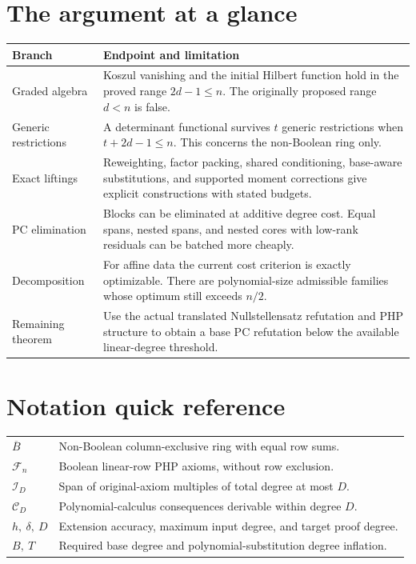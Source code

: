 \documentclass[11pt,oneside]{report}
\theoremstyle{research}
\theoremstyle{definition}
\theoremstyle{remark}
\newcommand{\BB}{\overline B}
\begin{document}
\section*{The argument at a glance}
\begin{longtable}{@{}L{0.26\textwidth}L{0.67\textwidth}@{}}
\toprule
Branch & Endpoint and limitation\\\midrule
Graded algebra & Koszul vanishing and the initial Hilbert function hold in the proved range $2d-1\le n$. The originally proposed range $d<n$ is false.\\
Generic restrictions & A determinant functional survives $t$ generic restrictions when $t+2d-1\le n$. This concerns the non-Boolean ring only.\\
Exact liftings & Reweighting, factor packing, shared conditioning, base-aware substitutions, and supported moment corrections give explicit constructions with stated budgets.\\
PC elimination & Blocks can be eliminated at additive degree cost. Equal spans, nested spans, and nested cores with low-rank residuals can be batched more cheaply.\\
Decomposition & For affine data the current cost criterion is exactly optimizable. There are polynomial-size admissible families whose optimum still exceeds $n/2$.\\
Remaining theorem & Use the actual translated Nullstellensatz refutation and PHP structure to obtain a base PC refutation below the available linear-degree threshold.\\\bottomrule
\end{longtable}
\section*{Notation quick reference}
\begin{tabular}{@{}L{0.22\textwidth}L{0.71\textwidth}@{}}
$\BB$ & Non-Boolean column-exclusive ring with equal row sums.\\[4pt]
$\mathcal F_n$ & Boolean linear-row PHP axioms, without row exclusion.\\[4pt]
$\mathcal I_D$ & Span of original-axiom multiples of total degree at most $D$.\\[4pt]
$\mathcal C_D$ & Polynomial-calculus consequences derivable within degree $D$.\\[4pt]
$h,\ \delta,\ D$ & Extension accuracy, maximum input degree, and target proof degree.\\[4pt]
$B,\ T$ & Required base degree and polynomial-substitution degree inflation.\\
\end{tabular}
\end{document}
